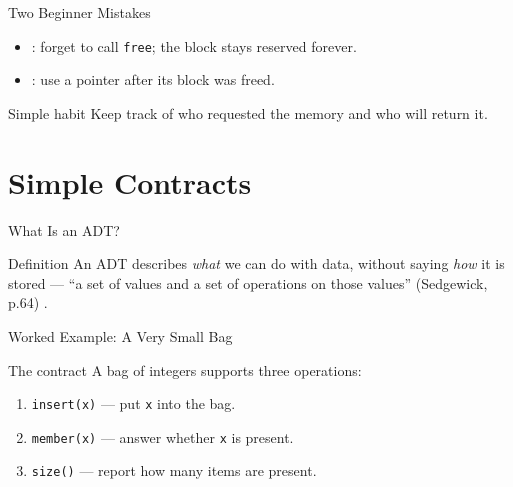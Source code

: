 \documentclass[aspectratio=169]{beamer}
\begin{document}
\begin{frame}{Two Beginner Mistakes}
  \begin{itemize}
    \item {}: forget to call \texttt{free}; the block stays
      reserved forever.
    \item {}: use a pointer after its block was freed.
  \end{itemize}
  \begin{exampleblock}{Simple habit}
    Keep track of who requested the memory and who will return it.
  \end{exampleblock}
\end{frame}


\section{Simple Contracts}


\begin{frame}{What Is an ADT?}
  \begin{block}{Definition}
    An ADT describes \emph{what} we can do with data, without saying
    \emph{how} it is stored --- ``a set of values and a set of operations on
    those values'' (Sedgewick, p.64)
    \cite{Sedgewick2011_algorithms}.
  \end{block}
\end{frame}

\begin{frame}{Worked Example: A Very Small Bag}
  \begin{block}{The contract}
    A bag of integers supports three operations:
  \end{block}
  \begin{enumerate}
    \item \texttt{insert(x)} --- put \texttt{x} into the bag.
    \item \texttt{member(x)} --- answer whether \texttt{x} is present.
    \item \texttt{size()} --- report how many items are present.
  \end{enumerate}
\end{frame}
\end{document}
